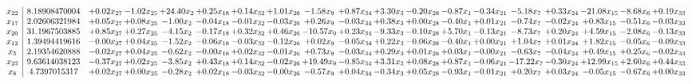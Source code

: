 \documentclass[9pt]{article}
\begin{document}
 \[\begin{array}{c| c c@{\hskip 2pt} c@{\hskip 2pt} c@{\hskip 2pt} c@{\hskip 2pt} c@{\hskip 2pt} c@{\hskip 2pt} c@{\hskip 2pt} c@{\hskip 2pt} c@{\hskip 2pt} c@{\hskip 2pt} c@{\hskip 2pt} c@{\hskip 2pt} c@{\hskip 2pt} c@{\hskip 2pt} c@{\hskip 2pt} c@{\hskip 2pt} c@{\hskip 2pt} }
 x_{22}   &  8.18908470004 & +  0.02 x_{27} & -1.02 x_{25} & + 24.40 x_{2} & +  0.25 x_{18} & +  0.14 x_{32} & +  1.01 x_{26} & -1.58 x_{9} & +  0.87 x_{34} & +  3.30 x_{3} & -0.20 x_{28} & -0.87 x_{1} & -0.34 x_{21} & -5.18 x_{7} & +  0.33 x_{24} & -21.08 x_{15} & -8.68 x_{6} & +  0.19 x_{33}\\
 x_{17}   &  2.02606321984 & +  0.05 x_{27} & +  0.08 x_{25} & -1.00 x_{2} & -0.04 x_{18} & -0.01 x_{32} & -0.03 x_{26} & +  0.26 x_{9} & -0.03 x_{34} & +  0.38 x_{3} & +  0.00 x_{28} & -0.40 x_{1} & +  0.01 x_{21} & -0.74 x_{7} & -0.02 x_{24} & +  0.83 x_{15} & -0.51 x_{6} & -0.03 x_{33}\\
 x_{20}   &  31.1967503885 & +  0.85 x_{27} & +  0.27 x_{25} & -4.15 x_{2} & -0.17 x_{18} & +  0.32 x_{32} & +  0.46 x_{26} & -10.57 x_{9} & +  0.23 x_{34} & -9.33 x_{3} & -0.10 x_{28} & +  5.70 x_{1} & -0.13 x_{21} & -8.73 x_{7} & +  0.20 x_{24} & +  4.59 x_{15} & -2.08 x_{6} & -0.13 x_{33}\\
 x_{12}   &  1.39494419616 & -0.00 x_{27} & +  0.04 x_{25} & -1.52 x_{2} & -0.06 x_{18} & -0.03 x_{32} & -0.12 x_{26} & +  0.02 x_{9} & -0.05 x_{34} & +  0.22 x_{3} & -0.06 x_{28} & -0.40 x_{1} & +  0.00 x_{21} & +  1.04 x_{7} & +  0.01 x_{24} & +  1.82 x_{15} & -0.05 x_{6} & -0.09 x_{33}\\
 x_{5}   &  2.19354620888 & -0.02 x_{27} & +  0.04 x_{25} & -0.62 x_{2} & -0.00 x_{18} & +  0.02 x_{32} & -0.01 x_{26} & +  0.73 x_{9} & -0.03 x_{34} & +  0.29 x_{3} & +  0.01 x_{28} & +  0.03 x_{1} & -0.00 x_{21} & -0.63 x_{7} & -0.04 x_{24} & +  0.49 x_{15} & +  0.25 x_{6} & -0.02 x_{33}\\
 x_{23}   &  9.63614038123 & -0.37 x_{27} & +  0.02 x_{25} & -3.85 x_{2} & +  0.43 x_{18} & +  0.14 x_{32} & -0.02 x_{26} & + 19.49 x_{9} & -0.85 x_{34} & +  3.31 x_{3} & +  0.08 x_{28} & +  0.87 x_{1} & -0.06 x_{21} & -17.22 x_{7} & -0.30 x_{24} & + 12.99 x_{15} & +  2.60 x_{6} & +  0.44 x_{33}\\
 x_{8}   &  4.7397015317 & +  0.02 x_{27} & +  0.00 x_{25} & -0.28 x_{2} & +  0.02 x_{18} & -0.03 x_{32} & -0.00 x_{26} & -0.57 x_{9} & +  0.04 x_{34} & -0.34 x_{3} & +  0.05 x_{28} & -0.93 x_{1} & -0.01 x_{21} & +  0.20 x_{7} & +  0.03 x_{24} & -0.05 x_{15} & -0.67 x_{6} & +  0.00 x_{33}\\

\end{array}\]
\end{document}
